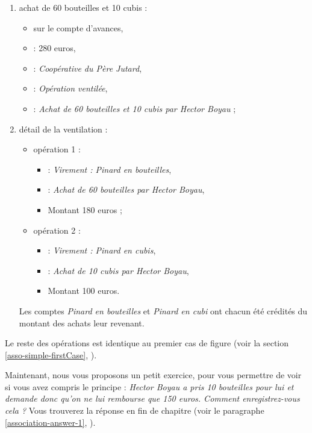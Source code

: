 \begin{enumerate}
	\item achat de 60 bouteilles et 10 cubis :
		\begin{itemize}
			\item sur le compte d'avances, 
			\item {} : 280 euros,
			\item {} : \emph{Coopérative du Père Jutard},
			\item {} : \emph{Opération ventilée},
			\item {} : \emph{Achat de 60 bouteilles et 10 cubis par Hector Boyau} ;
		\end{itemize}
	\item détail de la ventilation :
		\begin{itemize}
			\item opération 1 : 
				\begin{itemize}
					\item {} : \emph{Virement : Pinard en bouteilles},
					\item {} : \emph{Achat de 60 bouteilles par Hector Boyau},
					\item Montant 180 euros ;
				\end{itemize}
			\item opération 2 :
				\begin{itemize}
					\item {} : \emph{Virement : Pinard en cubis},
					\item {} : \emph{Achat de 10 cubis par Hector Boyau},
					\item Montant 100 euros. 
				\end{itemize}
		\end{itemize}
Les comptes \emph{Pinard en bouteilles} et \emph{Pinard en cubi} ont chacun été crédités du montant des achats leur revenant. 
\end{enumerate}

Le reste des opérations est identique au premier cas de figure (voir la section \vref{asso-simple-firstCase}, ).  

Maintenant, nous vous proposons un petit exercice, pour vous permettre de voir si vous avez compris le principe : \emph{Hector Boyau a pris 10 bouteilles pour lui et demande donc qu'on ne lui rembourse que 150 euros. Comment enregistrez-vous cela ?} Vous trouverez la réponse en fin de chapitre (voir le paragraphe \vref{association-answer-1}, ).

